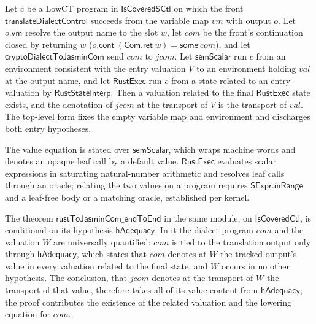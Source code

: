 \begin{theorem}
  \label{thm:rust-to-jasmin}
  \leanok
  Let $c$ be a LowCT program in $\mathsf{IsCoveredSCtl}$ on which the front
  $\mathsf{translateDialectControl}$ succeeds from the variable map $\mathit{vm}$
  with output $o$. Let $o.\mathsf{vm}$ resolve the output name to the slot $w$, let
  $\mathit{com}$ be the front's continuation closed by returning $w$
  ($o.\mathsf{cont}\ (\mathsf{Com.ret}\ w) = \mathsf{some}\ \mathit{com}$), and let
  $\mathsf{cryptoDialectToJasminCom}$ send $\mathit{com}$ to $\mathit{jcom}$. Let
  $\mathsf{semScalar}$ run $c$ from an environment consistent with the entry
  valuation $V$ to an environment holding $\mathit{val}$ at the output name, and let
  $\mathsf{RustExec}$ run $c$ from a state related to an entry valuation by
  $\mathsf{RustStateInterp}$. Then a valuation related to the final
  $\mathsf{RustExec}$ state exists, and the denotation of $\mathit{jcom}$ at the
  transport of $V$ is the transport of $\mathit{val}$. The top-level form fixes the
  empty variable map and environment and discharges both entry hypotheses.

  The value equation is stated over $\mathsf{semScalar}$, which wraps machine words
  and denotes an opaque leaf call by a default value. $\mathsf{RustExec}$ evaluates
  scalar expressions in saturating natural-number arithmetic and resolves leaf calls
  through an oracle; relating the two values on a program requires
  $\mathsf{SExpr.inRange}$ and a leaf-free body or a matching oracle, established per
  kernel.

  The theorem $\mathsf{rustToJasminCom\_endToEnd}$ in the same module, on
  $\mathsf{IsCoveredCtl}$, is conditional on its hypothesis $\mathsf{hAdequacy}$. In
  it the dialect program $\mathit{com}$ and the valuation $W$ are universally
  quantified: $\mathit{com}$ is tied to the translation output only through
  $\mathsf{hAdequacy}$, which states that $\mathit{com}$ denotes at $W$ the tracked
  output's value in every valuation related to the final state, and $W$ occurs in no
  other hypothesis. The conclusion, that $\mathit{jcom}$ denotes at the transport of
  $W$ the transport of that value, therefore takes all of its value content from
  $\mathsf{hAdequacy}$; the proof contributes the existence of the related valuation
  and the lowering equation for $\mathit{com}$.
\end{theorem}

